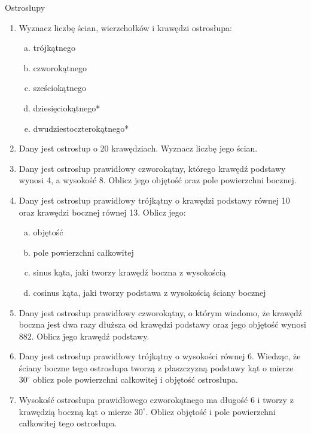 \documentclass[12pt,a4paper]{article}
\begin{document}
	\newpage
	\begin{center}
		\large Ostrosłupy
	\end{center}
	\begin{enumerate}[1.]
	\item Wyznacz liczbę ścian, wierzchołków i krawędzi ostrosłupa:
	\begin{enumerate}[a)]
		\item trójkątnego
		\item czworokątnego
		\item sześciokątnego
		\item dziesięciokątnego*
		\item dwudziestoczterokątnego*
	\end{enumerate}
	
	\item Dany jest ostrosłup o 20 krawędziach. Wyznacz liczbę jego ścian.

	\item Dany jest ostrosłup prawidłowy czworokątny, którego krawędź podstawy wynosi 4, a wysokość 8. Oblicz jego objętość oraz pole powierzchni bocznej.
	
	\item Dany jest ostrosłup prawidłowy trójkątny o krawędzi podstawy równej 10 oraz krawędzi bocznej równej 13. Oblicz jego:
	\begin{enumerate}[a)]
		\item objętość
		\item pole powierzchni całkowitej
		\item sinus kąta, jaki tworzy krawędź boczna z wysokością
		\item cosinus kąta, jaki tworzy podstawa z wysokością ściany bocznej
	\end{enumerate}

	\item Dany jest ostrosłup prawidłowy czworokątny, o którym wiadomo, że krawędź boczna jest dwa razy dłuższa od krawędzi podstawy oraz jego objętość wynosi 882. Oblicz jego krawędź podstawy.

	\item Dany jest ostrosłup prawidłowy trójkątny o wysokości równej 6. Wiedząc, że ściany boczne tego ostrosłupa tworzą z płaszczyzną podstawy kąt o mierze $30^\circ$ oblicz pole powierzchni całkowitej i objętość ostrosłupa.

	\item Wysokość ostrosłupa prawidłowego czworokątnego ma długość 6 i tworzy z krawędzią boczną kąt o mierze $30^\circ$. Oblicz objętość i pole powierzchni całkowitej tego ostrosłupa.


\end{enumerate}
\end{document}
